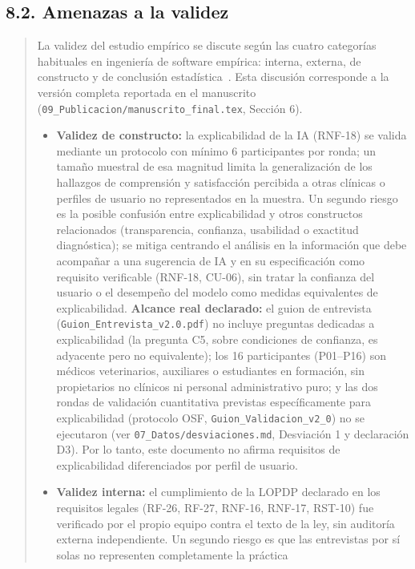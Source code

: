 \documentclass[
]{article}
\begin{document}
\subsection{8.2. Amenazas a la validez}\label{s7-4-amenazas-a-la-validez}
\begin{quote}
La validez del estudio empírico se discute según las cuatro categorías
habituales en ingeniería de software empírica: interna, externa, de
constructo y de conclusión estadística~\cite{wohlin2012}. Esta
discusión corresponde a la versión completa reportada en el manuscrito
(\texttt{09\_Publicacion/manuscrito\_final.tex}, Sección 6).
\begin{itemize}
  \item \textbf{Validez de constructo:} la explicabilidad de la IA
  (RNF-18) se valida mediante un protocolo con mínimo 6 participantes
  por ronda; un tamaño muestral de esa magnitud limita la
  generalización de los hallazgos de comprensión y satisfacción
  percibida a otras clínicas o perfiles de usuario no representados en
  la muestra. Un segundo riesgo es la posible confusión entre
  explicabilidad y otros constructos relacionados (transparencia,
  confianza, usabilidad o exactitud diagnóstica); se mitiga centrando
  el análisis en la información que debe acompañar a una sugerencia de
  IA y en su especificación como requisito verificable (RNF-18,
  CU-06), sin tratar la confianza del usuario o el desempeño del
  modelo como medidas equivalentes de explicabilidad. \textbf{Alcance
  real declarado:} el guion de entrevista
  (\texttt{Guion\_Entrevista\_v2.0.pdf}) no incluye preguntas
  dedicadas a explicabilidad (la pregunta C5, sobre condiciones de
  confianza, es adyacente pero no equivalente); los 16 participantes
  (P01–P16) son médicos veterinarios, auxiliares o estudiantes en
  formación, sin propietarios no clínicos ni personal administrativo
  puro; y las dos rondas de validación cuantitativa previstas
  específicamente para explicabilidad (protocolo OSF,
  \texttt{Guion\_Validacion\_v2\_0}) no se ejecutaron (ver
  \texttt{07\_Datos/desviaciones.md}, Desviación 1 y declaración D3).
  Por lo tanto, este documento no afirma requisitos de explicabilidad
  diferenciados por perfil de usuario.
  \item \textbf{Validez interna:} el cumplimiento de la LOPDP declarado
  en los requisitos legales (RF-26, RF-27, RNF-16, RNF-17, RST-10) fue
  verificado por el propio equipo contra el texto de la ley, sin
  auditoría externa independiente. Un segundo riesgo es que las
  entrevistas por sí solas no representen completamente la práctica

\end{itemize}
\end{quote}
\end{document}
